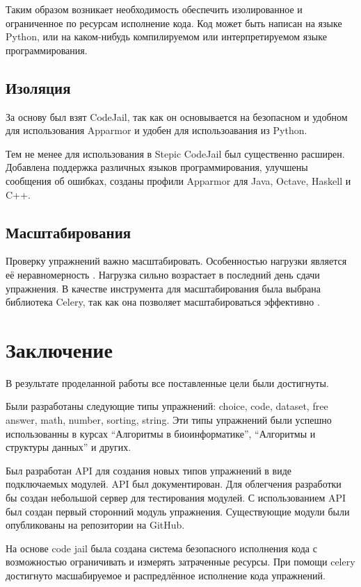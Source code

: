 \documentclass{matmex-diploma-custom}
\begin{document}
Таким образом возникает необходимость обеспечить изолированное
и ограниченное по ресурсам исполнение кода. Код может быть написан на
языке Python, или на каком-нибудь компилируемом или интерпретируемом
языке программирования.

\subsection{Изоляция}
За основу был взят CodeJail, так как он основывается на безопасном и
удобном для использования Apparmor \cite{Bauer} и удобен для
использоавания из Python.

Тем не менее для использования в Stepic CodeJail был существенно
расширен. Добавлена поддержка различных языков программирования,
улучшены сообщения об ошибках, созданы профили Apparmor для Java,
Octave, Haskell и C++.

\subsection{Масштабирования}
Проверку упражнений важно масштабировать. Особенностью нагрузки
является её неравномерность \cite{breslow2013studying}. Нагрузка
сильно возрастает в последний день сдачи упражнения. В качестве
инструмента для масштабирования была выбрана библиотека Celery, так
как она позволяет масштабироваться эффективно \cite{celery}.

\section*{Заключение}
В результате проделанной работы все поставленные цели были
достигнуты.

Были разработаны следующие типы упражнений: choice, code, dataset,
free answer, math, number, sorting, string. Эти типы упражнений были
успешно использованны в курсах ``Алгоритмы в биоинформатике'',
``Алгоритмы и структуры данных'' и других.

Был разработан API для создания новых типов упражнений в виде
подключаемых модулей. API был документирован. Для облегчения
разработки
 бы создан небольшой сервер для тестирования модулей. С
использованием API был создан первый сторонний модуль
упражнения. Существующие модули были опубликованы на репозитории на
GitHub.

На основе code jail была создана система безопасного исполнения кода с
возможностью ограничивать и измерять затраченные ресурсы. При помощи
celery достигнуто масшабируемое и распредлённое исполнение кода упражнений.



\end{document}

